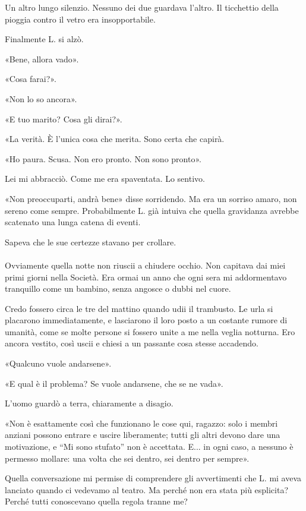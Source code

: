 \documentclass[a4paper,12pt]{book}
\begin{document}
Un altro lungo silenzio. Nessuno dei due guardava l'altro. Il ticchettio della
pioggia contro il vetro era insopportabile.

Finalmente L. si alzò.

«Bene, allora vado».

«Cosa farai?».

«Non lo so ancora».

«E tuo marito? Cosa gli dirai?».

«La verità. È l'unica cosa che merita. Sono certa che capirà.

«Ho paura. Scusa. Non ero pronto. Non sono pronto».

Lei mi abbracciò. Come me era spaventata. Lo sentivo.

«Non preoccuparti, andrà bene» disse sorridendo. Ma era un sorriso amaro, non
sereno come sempre. Probabilmente L. già intuiva che quella gravidanza avrebbe
scatenato una lunga catena di eventi.

Sapeva che le sue certezze stavano per crollare.

\paragraph{}
Ovviamente quella notte non riuscii a chiudere occhio. Non capitava dai miei
primi giorni nella Società. Era ormai un anno che ogni sera mi addormentavo
tranquillo come un bambino, senza angosce o dubbi nel cuore.

Credo fossero circa le tre del mattino quando udii il trambusto. Le urla si
placarono immediatamente, e lasciarono il loro posto a un costante rumore di
umanità, come se molte persone si fossero unite a me nella veglia notturna. Ero
ancora vestito, così uscii e chiesi a un passante cosa stesse accadendo.

«Qualcuno vuole andarsene».

«E qual è il problema? Se vuole andarsene, che se ne vada».

L'uomo guardò a terra, chiaramente a disagio.

«Non è esattamente così che funzionano le cose qui, ragazzo: solo i membri
anziani possono entrare e uscire liberamente; tutti gli altri devono dare una
motivazione, e ``Mi sono stufato'' non è accettata. E... in ogni caso, a nessuno
è permesso mollare: una volta che sei dentro, sei dentro per sempre».

Quella conversazione mi permise di comprendere gli avvertimenti che L. mi aveva
lanciato quando ci vedevamo al teatro. Ma perché non era stata più esplicita?
Perché tutti conoscevano quella regola tranne me?
\end{document}
